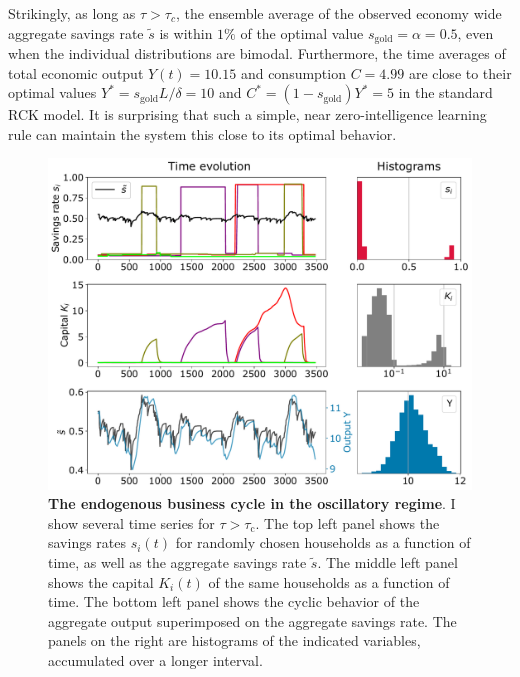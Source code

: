 Strikingly, as long as $\tau \! > \! \tau_{c}$, the ensemble average of the observed economy wide aggregate savings rate $\tilde{s}$ is within $1\%$ of the optimal value $s_\mathrm{gold}=\alpha=0.5$, even when the individual distributions are bimodal.
Furthermore, the time averages of total economic output $Y(t) \!=\! 10.15$ and  consumption $C \! = \! 4.99$ are close to their optimal values $Y^\ast \! = \! s_\mathrm{gold} L/\delta \! = \! 10$  and $C^\ast \! = \! (1-s_\mathrm{gold})Y^\ast \! = \! 5$  in the standard RCK model.  It is surprising that such a simple, near zero-intelligence learning rule can maintain the system this close to its optimal behavior.
\begin{figure}[t]
     \centering
       \includegraphics[width=0.99\linewidth]
       {figures/fig2.pdf}
       \caption[Trajectory of individual and collective oscillations in savings rates and economic output]{\textbf{ The endogenous business cycle in the oscillatory regime}.   I show several time series for $\tau \!>\! \tau_\mathrm{c}$.  
	The top left panel shows the savings rates $s_i(t)$ for randomly chosen households as a function of time, as well as the aggregate savings rate $\tilde{s}$.  
	The middle left panel shows the capital $K_i(t)$ of the same households as a function of time. The bottom left panel shows the cyclic behavior of the aggregate output superimposed on the aggregate savings rate.  The panels on the right are histograms of the indicated variables, accumulated over a longer interval.}
   \label{fig:micro_trajs}
\end{figure}

